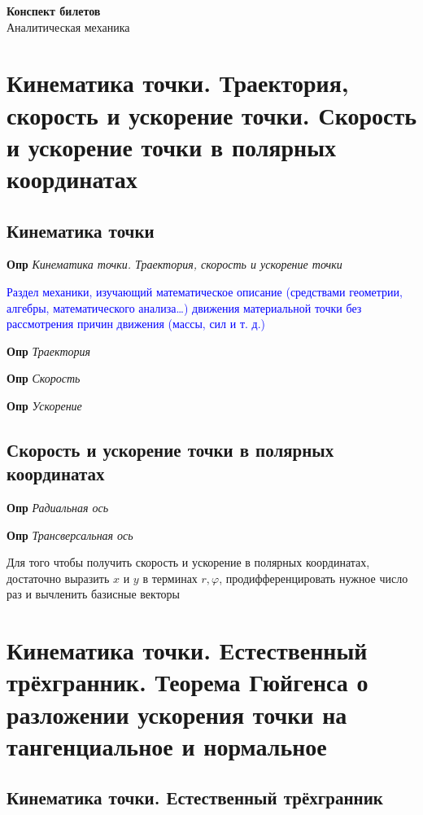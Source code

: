 \documentclass[a4paper, 14pt]{article}
\begin{document}
{\huge
    \begin{center}
    {\textbf{Конспект билетов}}
        \\
        Аналитическая механика
    \end{center}
}
    \tableofcontents \newpage
    
    \section{Кинематика точки. Траектория, скорость и ускорение точки.
    Скорость и ускорение точки в полярных координатах}
    
    \subsection{Кинематика точки}
    
    \textbf{Опр} \textit{Кинематика точки. Траектория, скорость и ускорение точки}
    
    \textcolor{blue}{Раздел механики, изучающий математическое описание (средствами геометрии, алгебры,
        математического анализа…) движения материальной точки без рассмотрения причин движения (массы, сил и т. д.)}
    
    \textbf{Опр} \textit{Траектория}
    
    \textbf{Опр} \textit{Скорость}
    
    \textbf{Опр} \textit{Ускорение}
    
    \subsection{Скорость и ускорение точки в полярных координатах}
    
    \textbf{Опр} \textit{Радиальная ось}
    
    \textbf{Опр} \textit{Трансверсальная ось}
    
    Для того чтобы получить скорость и ускорение в полярных координатах, достаточно выразить $x$ и $y$ в терминах $r,
    \varphi$, продифференцировать нужное число раз и вычленить базисные векторы
    
    \section{Кинематика точки. Естественный трёхгранник.
    Теорема Гюйгенса о разложении ускорения точки на тангенциальное и нормальное}
    
    \subsection{Кинематика точки. Естественный трёхгранник}
    
\end{document}
